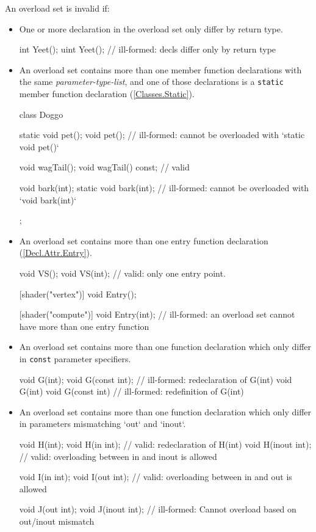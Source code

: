 \p An overload set is invalid if:
\begin{itemize}
  \item One or more declaration in the overload set only differ by return type.

\begin{HLSL}
int Yeet();
uint Yeet(); // ill-formed: decls differ only by return type
\end{HLSL}

  \item An overload set contains more than one member function declarations with
  the same \textit{parameter-type-list}, and one of those declarations is a
  \texttt{static} member function declaration (\ref{Classes.Static}).

  \begin{HLSL}
class Doggo {
  static void pet();
  void pet();              // ill-formed: cannot be overloaded with `static void pet()`

  void wagTail();
  void wagTail() const;    // valid

  void bark(int);
  static void bark(int);   // ill-formed: cannot be overloaded with `void bark(int)`
};
\end{HLSL}

  \item An overload set contains more than one entry function declaration (\ref{Decl.Attr.Entry}).

\begin{HLSL}
void VS();
void VS(int);              // valid: only one entry point.

[shader("vertex")]
void Entry();

[shader("compute")]
void Entry(int);           // ill-formed: an overload set cannot have more than one entry function
\end{HLSL}

\item An overload set contains more than one function declaration which only
  differ in \texttt{const} parameter specifiers.
\begin{HLSL}
void G(int);
void G(const int);         // ill-formed: redeclaration of G(int)
void G(int) {}
void G(const int) {}       // ill-formed: redefinition of G(int)
\end{HLSL}

\item An overload set contains more than one function declaration which only
differ in parameters mismatching `out` and `inout`.

\begin{HLSL}
void H(int);
void H(in int);            // valid: redeclaration of H(int)
void H(inout int);         // valid: overloading between in and inout is allowed

void I(in int);
void I(out int);           // valid: overloading between in and out is allowed

void J(out int);
void J(inout int);         // ill-formed: Cannot overload based on out/inout mismatch
\end{HLSL}
\end{itemize}

